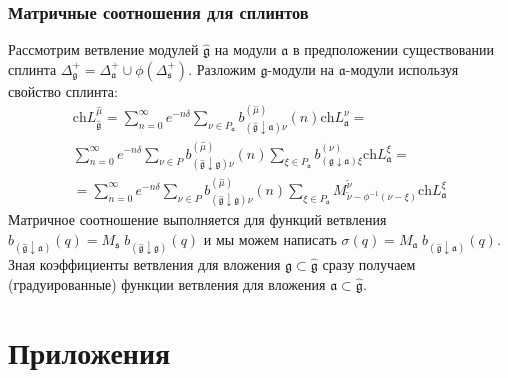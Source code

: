 \documentclass[pdftex]{beamer}
\newcommand{\gf}{\mathfrak{g}}
\newcommand{\gfh}{\hat{\mathfrak{g}}}
\newcommand{\af}{\mathfrak{a}}
\newcommand{\sfr}{\mathfrak{s}}
\theoremstyle{definition} \newtheorem{Def}{Определение}
\begin{document}
\begin{frame}
    \frametitle{Матричные соотношения для сплинтов}
Рассмотрим ветвление модулей  $\gfh$ на модули $\af$ в предположении существовании сплинта
$\Delta^{+}_{\gf}=\Delta^{+}_{\af}\cup \phi(\Delta^{+}_{\sfr})$.
Разложим  $\gf$-модули на 
$\af$-модули используя свойство сплинта:
\begin{multline}
  \label{eq:125}
  \mathrm{ch}L^{\hat{\mu}}_{\gfh}=
\sum_{n=0}^{\infty}e^{-n\delta} \sum_{\nu\in P_{\af}} b^{(\hat{\mu})}_{(\gfh\downarrow\af)\nu}(n) \mathrm{ch} L^{\nu}_{\af}=\\
\sum_{n=0}^{\infty} e^{-n\delta} \sum_{\nu\in P} b^{(\hat{\mu})}_{(\gfh\downarrow\gf )\nu}(n) \sum_{\xi\in P_{\af}} b^{(\nu)}_{(\gf\downarrow \af) \xi}\mathrm{ch} L^{\xi}_{\af}=\\
=\sum_{n=0}^{\infty} e^{-n\delta} \sum_{\nu\in P} b^{(\hat{\mu})}_{(\gfh\downarrow\gf )\nu}(n) \sum_{\xi\in P_{\af}} M^{\widetilde{\nu}}_{  \widetilde{\nu}-\phi^{-1}( \nu-\xi )}\mathrm{ch} L^{\xi}_{\af}
\end{multline}
  Матричное соотношение выполняется для функций ветвления $b_{(\gfh\downarrow\af)}(q)= M_{\sfr}\;
b_{(\gfh\downarrow\gf)}(q)$ и мы можем написать
$\sigma(q)=M_{\af}\; b_{(\gfh\downarrow\af)}(q)$.  Зная коэффициенты ветвления для вложения $\gf\subset\gfh$  сразу получаем (градуированные) функции ветвления для вложения $\af\subset \gfh$.
\end{frame}

\section{Приложения}
\label{sec:applications}
\end{document}
